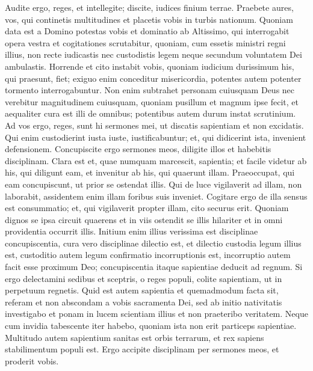 \begin{biblechapter}  
\verse Audite ergo, reges, et intellegite; discite, iudices finium terrae. 
\verse Praebete aures, vos, qui continetis multitudines et placetis vobis in turbis nationum. 
\verse Quoniam data est a Domino potestas vobis et dominatio ab Altissimo, qui interrogabit opera vestra et cogitationes scrutabitur, 
\verse quoniam, cum essetis ministri regni illius, non recte iudicastis nec custodistis legem neque secundum voluntatem Dei ambulastis. 
\verse Horrende et cito instabit vobis, quoniam iudicium durissimum his, qui praesunt, fiet; 
\verse exiguo enim conceditur misericordia, potentes autem potenter tormento interrogabuntur. 
\verse Non enim subtrahet personam cuiusquam Deus nec verebitur magnitudinem cuiusquam, quoniam pusillum et magnum ipse fecit, et aequaliter cura est illi de omnibus; 
\verse potentibus autem durum instat scrutinium. 
\verse Ad vos ergo, reges, sunt hi sermones mei, ut discatis sapientiam et non excidatis. 
\verse Qui enim custodierint iusta iuste, iustificabuntur; et, qui didicerint ista, invenient defensionem. 
\verse Concupiscite ergo sermones meos, diligite illos et habebitis disciplinam. 
\verse Clara est et, quae numquam marcescit, sapientia; et facile videtur ab his, qui diligunt eam, et invenitur ab his, qui quaerunt illam. 
\verse Praeoccupat, qui eam concupiscunt, ut prior se ostendat illis. 
\verse Qui de luce vigilaverit ad illam, non laborabit, assidentem enim illam foribus suis inveniet. 
\verse Cogitare ergo de illa sensus est consummatio; et, qui vigilaverit propter illam, cito securus erit. 
\verse Quoniam dignos se ipsa circuit quaerens et in viis ostendit se illis hilariter et in omni providentia occurrit illis. 
\verse Initium enim illius verissima est disciplinae concupiscentia, cura vero disciplinae dilectio est, 
\verse et dilectio custodia legum illius est, custoditio autem legum confirmatio incorruptionis est, 
\verse incorruptio autem facit esse proximum Deo; 
\verse concupiscentia itaque sapientiae deducit ad regnum. 
\verse Si ergo delectamini sedibus et sceptris, o reges populi, colite sapientiam, ut in perpetuum regnetis. 
\verse Quid est autem sapientia et quemadmodum facta sit, referam et non abscondam a vobis sacramenta Dei, sed ab initio nativitatis investigabo et ponam in lucem scientiam illius et non praeteribo veritatem. 
\verse Neque cum invidia tabescente iter habebo, quoniam ista non erit particeps sapientiae. 
\verse Multitudo autem sapientium sanitas est orbis terrarum, et rex sapiens stabilimentum populi est. 
\verse Ergo accipite disciplinam per sermones meos, et proderit vobis. 
\end{biblechapter}

